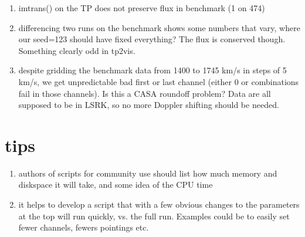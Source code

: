 \documentclass[12pt,a4paper]{article}
\begin{document}
\begin{enumerate}

\item imtrans() on the TP does not preserve flux in benchmark (1 on 474)
\item differencing two runs on the benchmark shows some numbers that vary, where our seed=123 should have fixed everything?
  The flux is conserved though. Something clearly odd in tp2vis.
\item despite gridding the benchmark data from 1400 to 1745 km/s in steps of 5 km/s, we get unpredictable bad first or last channel
  (either 0 or combinations fail in those channels). Is this a CASA roundoff problem?  Data are all supposed to be in LSRK, so no more
  Doppler shifting should be needed.

\end{enumerate}

\section{tips}

\begin{enumerate}

\item authors of scripts for community use should list how much memory and diskspace it will take, and some idea of the CPU time

\item it helps to develop a script that with a few obvious changes to the parameters at the top will run quickly, vs. the full run.
  Examples could be to easily set fewer channels, fewers pointings etc.
  
\end{enumerate}
\end{document}
